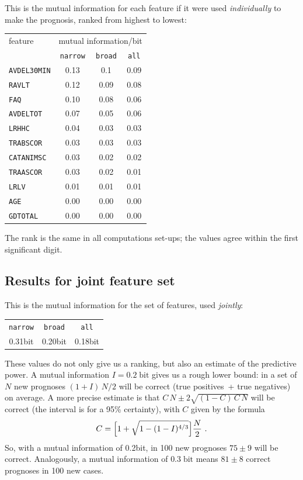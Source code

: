 \documentclass[\ifafour a4paper,12pt,\else a5paper,10pt,\fi%
onecolumn,oneside,article,%
british%
]{memoir}
\theoremstyle{remark}
\theoremstyle{innote}
\renewcommand*{\|}[1][]{\nonscript\:#1\vert\nonscript\:\mathopen{}}
\newcommand*{\bit}{\textrm{bit}}
\newcommand*{\narrow}{\texttt{narrow}}
\newcommand*{\broad}{\texttt{broad}}
\newcommand*{\all}{\texttt{all}}
\begin{document}
This is the mutual information for each feature if it were used
\emph{individually} to make the prognosis, ranked
from highest to lowest:
\begin{center}
  \begin{tabular}[c]{l|ccc}
    feature &\multicolumn{3}{c}{mutual information/bit} \\
    & \narrow & \broad & \all \\
\hline
    \texttt{AVDEL30MIN} & 0.13 & 0.1 & 0.09\\
    \texttt{RAVLT} & 0.12 & 0.09 & 0.08\\
    \texttt{FAQ} & 0.10 & 0.08 & 0.06\\
    \texttt{AVDELTOT} & 0.07 & 0.05 & 0.06\\
    \texttt{LRHHC} & 0.04 & 0.03 & 0.03\\
    \texttt{TRABSCOR} & 0.03 & 0.03 & 0.03\\
    \texttt{CATANIMSC} & 0.03 & 0.02 & 0.02\\
    \texttt{TRAASCOR} & 0.03 & 0.02 & 0.01\\
    \texttt{LRLV} & 0.01 & 0.01 & 0.01\\
    \texttt{AGE} & 0.00 & 0.00 & 0.00\\
    \texttt{GDTOTAL} & 0.00 & 0.00 & 0.00
  \end{tabular}                            
\end{center}
The rank is the same in all computations set-ups; the values agree within
the first significant digit.

\subsection{Results for joint feature set}
\label{sec:joint}

This is the mutual information for the set of features, used \emph{jointly}:
\begin{center}
  \begin{tabular}[c]{ccc}
    \narrow & \broad & \all \\
    0.31\;\bit & 0.20\;\bit & 0.18\;bit
  \end{tabular}
\end{center}
These values do not only give us a ranking, but also an estimate of the
predictive power. A mutual information $I=0.2\;\bit$ gives us a rough lower
bound: in a set of $N$ new prognoses $(1+I)\,N/2$ will be correct (true
positives~+ true negatives) on average. A more precise estimate is that
$C\,N \pm 2\sqrt{(1-C)\,C\,N}$ will be correct (the interval is for a 95\%
certainty), with $C$ given by the formula
\begin{equation}
  \label{eq:mutualinfo_est}
 C = \Bigl[1+\sqrt{1-(1-I)^{4/3}}\Bigr]\frac{N}{2} \ .
\end{equation}
So, with a mutual information of 0.2\;\bit, in 100 new prognoses $75\pm 9$
will be correct. Analogously, a mutual information of $0.3\;\bit$ means
$81\pm 8$ correct prognoses in 100 new cases.
\end{document}
